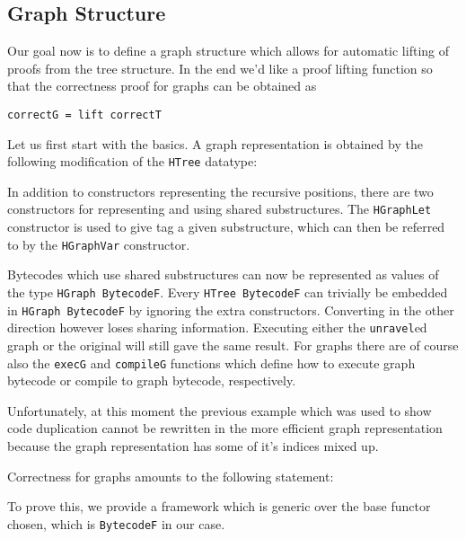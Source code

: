 \documentclass[a4paper]{article}
\begin{document}
        \subsection{Graph Structure}
        
        Our goal now is to define a graph structure which allows for automatic lifting of proofs from the tree structure. In the end we'd like a proof lifting
        function so that the correctness proof for graphs can be obtained as
        \begin{verbatim}
correctG = lift correctT
        \end{verbatim}
        
        Let us first start with the basics. A graph representation is obtained by the following modification of the \texttt{HTree} datatype:
        
        
        In addition to constructors representing the recursive positions, there are two constructors for representing and using shared substructures.
        The \texttt{HGraphLet} constructor is used to give tag a given substructure, which can then be referred to by the \texttt{HGraphVar} constructor. 
        
        Bytecodes which use shared substructures can now be represented as values of the type \texttt{HGraph BytecodeF}. Every \texttt{HTree BytecodeF} 
        can trivially be embedded in \texttt{HGraph BytecodeF} by ignoring the extra constructors. Converting in the other direction however loses sharing
        information. Executing either the \texttt{unravel}ed graph or the original will still gave the same result. For graphs there are of course also the
        \texttt{execG} and \texttt{compileG} functions which define how to execute graph bytecode or compile to graph bytecode, respectively. 
        
        Unfortunately, at this moment the previous example which was used to show code duplication cannot be rewritten in the more efficient graph 
        representation because the graph representation has some of it's indices mixed up.
        
        Correctness for graphs amounts to the following statement:
        
        
        To prove this, we provide a framework which is generic over the base functor chosen, which is \texttt{BytecodeF} in our case. 
        
\end{document}
